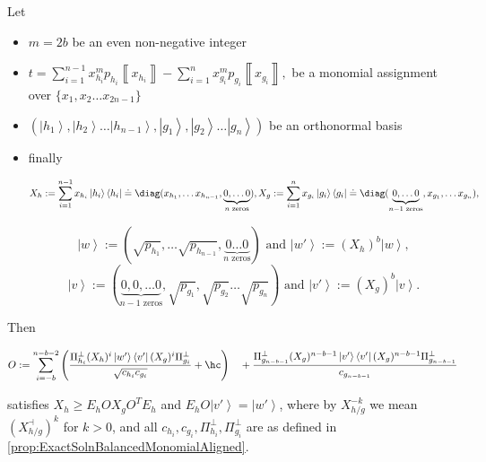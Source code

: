 \documentclass{theoretics}
\begin{document}
\begin{proposition}
  \label{prop:ExactSolnUnbalancedMonomialAligned} Let
  \begin{itemize}
    \item $m=2b$ be an even non-negative integer
    \item $
            t=\sum_{i=1}^{n-1}x_{h_{i}}^{m}p_{h_{i}}\left\llbracket x_{h_{i}}\right\rrbracket -\sum_{i=1}^{n}x_{g_{i}}^{m}p_{g_{i}}\left\llbracket x_{g_{i}}\right\rrbracket ,
          $ be a monomial assignment over $\{x_{1},x_{2}\dots x_{2n-1}\}$
    \item $\left(\left|h_{1}\right\rangle ,\left|h_{2}\right\rangle \dots\left|h_{n-1}\right\rangle ,\left|g_{1}\right\rangle ,\left|g_{2}\right\rangle \dots\left|g_{n}\right\rangle \right)$
          be an orthonormal basis
    \item finally
          \begin{footnotesize}
            \begin{displaymath}
              X_{h}:=\sum_{i=1}^{n-1}x_{h_{i}}\left|h_{i}\right\rangle \left\langle h_{i}\right|\doteq\diag(x_{h_{1}},\dots x_{h_{n-1}},\underbrace{0,\dots0}_{n\text{ zeros}}),
              X_{g}:=\sum_{i=1}^{n}x_{g_{i}}\left|g_{i}\right\rangle \left\langle g_{i}\right|\doteq\diag(\underbrace{0,\dots0}_{n-1\text{ zeros}},x_{g_{1}},\dots x_{g_{n}}),
            \end{displaymath}
          \end{footnotesize}
          \begin{displaymath}
            \left|w\right\rangle :=(\sqrt{p_{h_{1}}},\dots\sqrt{p_{h_{n-1}}},\underbrace{0\dots0}_{n\text{ zeros}}) \text{ and }\left|w'\right\rangle :=(X_{h})^{b}\left|w\right\rangle,
          \end{displaymath}
          \begin{displaymath}
            \left|v\right\rangle :=(\underbrace{0,0,\dots0}_{n-1\text{ zeros}},\sqrt{p_{g_{1}}},\sqrt{p_{g_{2}}}\dots\sqrt{p_{g_{n}}}) \text{ and }\left|v'\right\rangle :=(X_{g})^{b}\left|v\right\rangle.
          \end{displaymath}
  \end{itemize}
  Then \begin{small}
    \begin{align*}
      O  :=\sum_{i=-b}^{n-b-2}\left(\frac{\Pi_{h_{i}}^{\perp}(X_{h})^{i}\left|w'\right\rangle \left\langle v'\right|(X_{g})^{i}\Pi_{g_{i}}^{\perp}}{\sqrt{c_{h_{i}}c_{g_{i}}}}+\hc\right)
      \quad+\frac{\Pi_{g_{n-b-1}}^{\perp}(X_{g})^{n-b-1}\left|v'\right\rangle \left\langle v'\right|(X_{g})^{n-b-1}\Pi_{g_{n-b-1}}^{\perp}}{c_{g_{n-b-1}}}
    \end{align*}
  \end{small}
  satisfies $X_{h}\ge E_{h}OX_{g}O^{T}E_{h}$ and $E_{h}O\left|v'\right\rangle =\left|w'\right\rangle$,
  where by $X_{h/g}^{-k}$ we mean $(X_{h/g}^{\dashv})^{k}$
  for $k>0$, and all $c_{h_{i}},c_{g_{i}},\Pi_{h_{i}}^{\perp},\Pi_{g_{i}}^{\perp}$
  are as defined in \cref{prop:ExactSolnBalancedMonomialAligned}.
\end{proposition}
\end{document}
